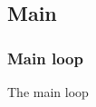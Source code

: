 \subsectionfont{\fontsize{14}{14}\selectfont}


\subsection{Main}

\subsubsection{Main loop}
The main loop\\